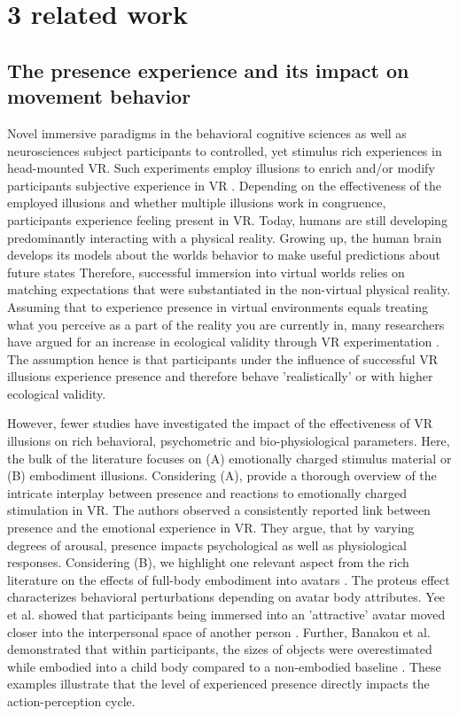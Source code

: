 \section{3 related work}

\subsection{The presence experience and its impact on movement behavior}
Novel immersive paradigms in the behavioral cognitive sciences as well as neurosciences subject participants to controlled, yet stimulus rich experiences in head-mounted VR. Such experiments employ illusions to enrich and/or modify participants subjective experience in VR \cite{Gonzalez-Franco2017}. Depending on the effectiveness of the employed illusions and whether multiple illusions work in congruence, participants experience feeling present in VR. Today, humans are still developing predominantly interacting with a physical reality. Growing up, the human brain develops its models about the worlds behavior to make useful predictions about future states \cite{} %
Therefore, successful immersion into virtual worlds relies on matching expectations that were substantiated in the non-virtual physical reality. Assuming that to experience presence in virtual environments equals treating what you perceive as a part of the reality you are currently in, many researchers have argued for an increase in ecological validity through VR experimentation \cite{Bohil2011, Parsons2015, Parsons2017}. The assumption hence is that participants under the influence of successful VR illusions experience presence and therefore behave 'realistically' or with higher ecological validity.

However, fewer studies have investigated the impact of the effectiveness of VR illusions on rich behavioral, psychometric and bio-physiological parameters. Here, the bulk of the literature focuses on (A) emotionally charged stimulus material or (B) embodiment illusions. Considering (A), \cite{Diemer2015} provide a thorough overview of the intricate interplay between presence and reactions to emotionally charged stimulation in VR. The authors observed a consistently reported link between presence and the emotional experience in VR. They argue, that by varying degrees of arousal, presence impacts psychological as well as physiological responses. Considering (B), we highlight one relevant aspect from the rich literature on the effects of full-body embodiment into avatars \cite{Maister2015}. The proteus effect characterizes behavioral perturbations depending on avatar body attributes. Yee et al. showed that participants being immersed into an 'attractive' avatar moved closer into the interpersonal space of another person \cite{Yee2007}. Further, Banakou et al. demonstrated that within participants, the sizes of objects were overestimated while embodied into a child body compared to a non-embodied baseline \cite{Banakou2013}. These examples illustrate that the level of experienced presence directly impacts the action-perception cycle.

